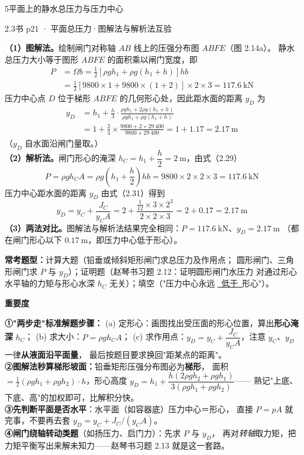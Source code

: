 \begin{kaodian}{5}{平面上的静水总压力与压力中心}
\begin{liti}{2.3}{书 p21 · 平面总压力·图解法与解析法互验}
\begin{jie}
\textbf{（1）图解法。}绘制闸门对称轴 $AB$ 线上的压强分布图 $ABFE$（图 2.14a）。
静水总压力大小等于图形 $ABFE$ 的面积乘以闸门宽度，即
\[
\begin{aligned}
P&=\Omega b=\frac{1}{2}\left[\rho gh_1+\rho g(h_1+h)\right]hb\\
 &=\frac{1}{2}\left[9800\times1+9800\times(1+2)\right]\times2\times3=117.6\ \mathrm{kN}
\end{aligned}
\]
压力中心点 $D$ 位于梯形 $ABFE$ 的几何形心处，因此距水面的距离 $y_D$ 为
\[
\begin{aligned}
y_D&=h_1+\frac{h}{3}\cdot\frac{\rho gh_1+2\rho g(h_1+h)}{\rho gh_1+\rho g(h_1+h)}\\
   &=1+\frac{2}{3}\times\frac{9800+2\times29\ 400}{9800+29\ 400}=1+1.17=2.17\ \mathrm{m}
\end{aligned}
\]
（$y_D$ 自水面沿闸门量取。）\\
\textbf{（2）解析法。}闸门形心的淹深 $h_C=h_1+\dfrac{h}{2}=2\ \mathrm{m}$，由式（2.29）
\[ P=\rho gh_C A=\rho g\left(h_1+\frac{h}{2}\right)hb=9800\times2\times2\times3=117.6\ \mathrm{kN} \]
压力中心距水面的距离 $y_D$ 由式（2.31）得到
\[ y_D=y_C+\frac{J_C}{y_C A}=2+\frac{\frac{1}{12}\times3\times2^3}{2\times2\times3}=2+0.17=2.17\ \mathrm{m} \]
\textbf{（3）两法对比。}图解法与解析法结果完全相同：$P=117.6\ \mathrm{kN}$、$y_D=2.17\ \mathrm{m}$
（都在闸门形心以下 $0.17\ \mathrm{m}$，即压力中心低于形心）。
\end{jie}
\end{liti}

\textbf{常考题型：}计算大题（铅垂或倾斜矩形闸门求总压力及作用点；
圆形闸门、三角形闸门求 $P$ 与 $y_D$）；证明题（赵琴书习题 2.12：证明圆形闸门水压力
对通过形心水平轴的力矩与形心水深 $h_C$ 无关）；填空（"压力中心永远
\underline{\ 低于\ }形心"）。

\textbf{重要度 }\quad{}\quad{}

\begin{banfa}
\textbf{①"两步走"标准解题步骤：}
(a) 定形心：画图找出受压面的形心位置，算出\textbf{形心淹深} $h_C$；
(b) 求大小：$P=\rho g h_C A$；
(c) 求作用点：$y_D=y_C+\dfrac{J_C}{y_C A}$，注意 $y_C$、$y_D$ 一律\textbf{从液面沿平面量}，
最后按题目要求换回"距某点的距离"。\\
\textbf{②图解法秒算梯形坡面：}铅垂矩形压强分布图必为\textbf{梯形}，
面积 $=\frac{1}{2}(\rho gh_1+\rho gh_2)\cdot h$，形心高度
$y_D=h_1+\dfrac{h(2\rho gh_2+\rho gh_1)}{3(\rho gh_1+\rho gh_2)}$——
熟记"上底、下底、高"的加权即可，比解积分快。\\
\textbf{③先判断平面是否水平}：水平面（如容器底）压力中心＝形心，
直接 $P=pA$ 就完事，不要再去套 $y_D=y_C+J_C/(y_C A)$。\\
\textbf{④闸门绕轴转动类题}（如扬压力、启门力）：先求 $P$ 与 $y_D$，
再对\emph{转轴}取力矩，把力矩平衡写出来解未知力——赵琴书习题 2.13 就是这一套路。
\end{banfa}


\end{kaodian}
